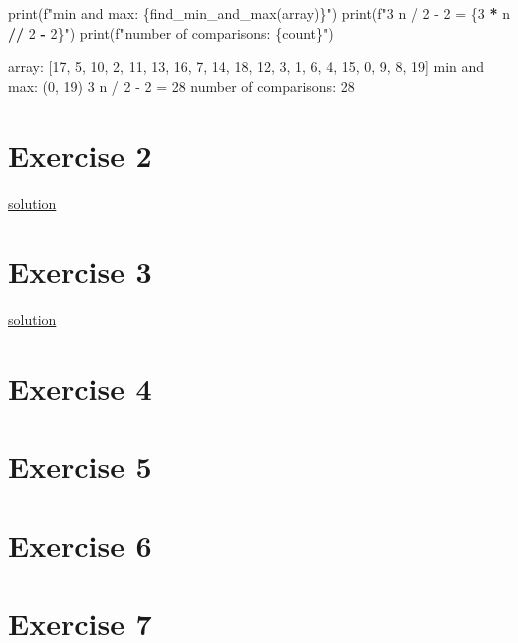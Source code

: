 \documentclass[
]{article}
\newenvironment{Shaded}{\begin{snugshade}}{\end{snugshade}}
\newcommand{\BuiltInTok}[1]{#1}
\newcommand{\DecValTok}[1]{\textcolor[rgb]{0.00,0.00,0.81}{#1}}
\newcommand{\NormalTok}[1]{#1}
\newcommand{\OperatorTok}[1]{\textcolor[rgb]{0.81,0.36,0.00}{\textbf{#1}}}
\newcommand{\SpecialCharTok}[1]{\textcolor[rgb]{0.00,0.00,0.00}{#1}}
\newcommand{\SpecialStringTok}[1]{\textcolor[rgb]{0.31,0.60,0.02}{#1}}
\begin{document}
\begin{Shaded}
\begin{Highlighting}[]
\BuiltInTok{print}\NormalTok{(}\SpecialStringTok{f"min and max: }\SpecialCharTok{\{}\NormalTok{find_min_and_max(array)}\SpecialCharTok{\}}\SpecialStringTok{"}\NormalTok{)}
\BuiltInTok{print}\NormalTok{(}\SpecialStringTok{f"3 n / 2 - 2 = }\SpecialCharTok{\{}\DecValTok{3} \OperatorTok{*} \SpecialCharTok{n} \OperatorTok{//} \DecValTok{2} \OperatorTok{-} \DecValTok{2}\SpecialCharTok{\}}\SpecialStringTok{"}\NormalTok{)}
\BuiltInTok{print}\NormalTok{(}\SpecialStringTok{f"number of comparisons: }\SpecialCharTok{\{}\NormalTok{count}\SpecialCharTok{\}}\SpecialStringTok{"}\NormalTok{)}
  
\end{Highlighting}
\end{Shaded}

\begin{Shaded}
\begin{Highlighting}[]
\NormalTok{array: [17, 5, 10, 2, 11, 13, 16, 7, 14, 18, 12, 3, 1, 6, 4, 15, 0, 9, 8, 19]}
\NormalTok{min and max: (0, 19)}
\NormalTok{3 n / 2 - 2 = 28}
\NormalTok{number of comparisons: 28}
\end{Highlighting}
\end{Shaded}

\hypertarget{exercise-2}{%
\section{Exercise 2}\label{exercise-2}}

\href{https://www.zhihu.com/question/33113457}{solution}

\hypertarget{exercise-3}{%
\section{Exercise 3}\label{exercise-3}}

\href{http://theory.stanford.edu/~tim/w11/l/qsort.pdf}{solution}

\hypertarget{exercise-4}{%
\section{Exercise 4}\label{exercise-4}}

\hypertarget{exercise-5}{%
\section{Exercise 5}\label{exercise-5}}

\hypertarget{exercise-6}{%
\section{Exercise 6}\label{exercise-6}}

\hypertarget{exercise-7}{%
\section{Exercise 7}\label{exercise-7}}
\end{document}

